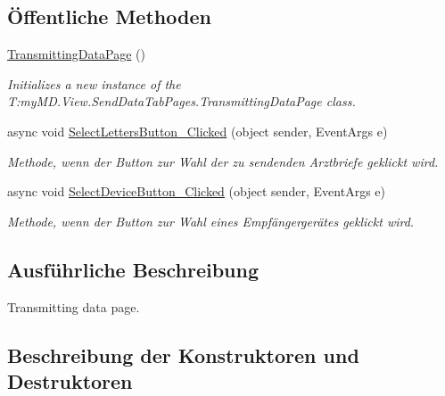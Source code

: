 \subsection*{Öffentliche Methoden}
\begin{DoxyCompactItemize}
\item 
\mbox{\hyperlink{classmy_m_d_1_1_view_1_1_send_data_tab_pages_1_1_transmitting_data_page_ac1fa89a1f86e8f1b72e0a07ab569a525}{Transmitting\+Data\+Page}} ()
\begin{DoxyCompactList}\small\item\em Initializes a new instance of the T\+:my\+M\+D.\+View.\+Send\+Data\+Tab\+Pages.\+Transmitting\+Data\+Page class. \end{DoxyCompactList}\item 
async void \mbox{\hyperlink{classmy_m_d_1_1_view_1_1_send_data_tab_pages_1_1_transmitting_data_page_abe7d80460f8b561dfecadfd4fbdd849f}{Select\+Letters\+Button\+\_\+\+Clicked}} (object sender, Event\+Args e)
\begin{DoxyCompactList}\small\item\em Methode, wenn der Button zur Wahl der zu sendenden Arztbriefe geklickt wird. \end{DoxyCompactList}\item 
async void \mbox{\hyperlink{classmy_m_d_1_1_view_1_1_send_data_tab_pages_1_1_transmitting_data_page_a5412e851cb3b9c6f53c66edbae50292d}{Select\+Device\+Button\+\_\+\+Clicked}} (object sender, Event\+Args e)
\begin{DoxyCompactList}\small\item\em Methode, wenn der Button zur Wahl eines Empfängergerätes geklickt wird. \end{DoxyCompactList}\end{DoxyCompactItemize}


\subsection{Ausführliche Beschreibung}
Transmitting data page. 



\subsection{Beschreibung der Konstruktoren und Destruktoren}
\mbox{\label{classmy_m_d_1_1_view_1_1_send_data_tab_pages_1_1_transmitting_data_page_ac1fa89a1f86e8f1b72e0a07ab569a525}} 
